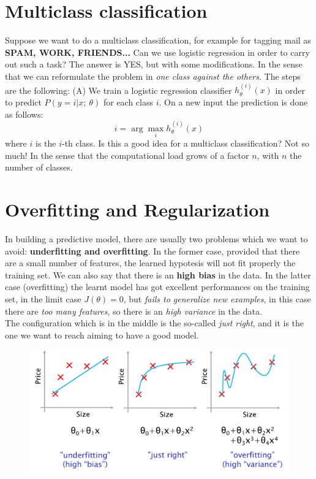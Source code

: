 \section{Multiclass classification}
Suppose we want to do a multiclass classification, for example for tagging mail as \textbf{SPAM, WORK, FRIENDS...} Can we use logistic regression in order to carry out such a task? The answer is YES, but with some modifications. In the sense that we can reformulate the problem in \textit{one class against the others}. The steps are the following: (A) We train a logistic regression classifier $h_\theta^{(i)}(x)$ in order to predict $P(y=i|x;\ \theta)$ for each class $i$. On a new input the prediction is done as follows:
\begin{equation}
    i=\arg\max_{i} h_\theta^{(i)}(x)
\end{equation}
where $i$ is the $i$-th class. Is this a good idea for a multiclass classification? Not so much! In the sense that the computational load grows of a factor $n$, with $n$ the number of classes. 

\section{Overfitting and Regularization}
In building a predictive model, there are usually two problems which we want to avoid: \textbf{underfitting and overfitting}. In the former case, provided that there are a small number of features, the learned hypotesis will not fit properly the training set. We can also say that there is an \textbf{high bias} in the data. In the latter case (overfitting) the learnt model has got excellent performances on the training set, in the limit case $J(\theta)=0$, but \textit{fails to generalize new examples}, in this case there are \textit{too many features}, so there is an \textit{high variance} in the data. \\
The configuration which is in the middle is the so-called \textit{just right}, and it is the one we want to reach aiming to have a good model. 

\begin{figure}[h]
    \centering
    \includegraphics[scale=0.5]{img/over_under.png}
\end{figure}

